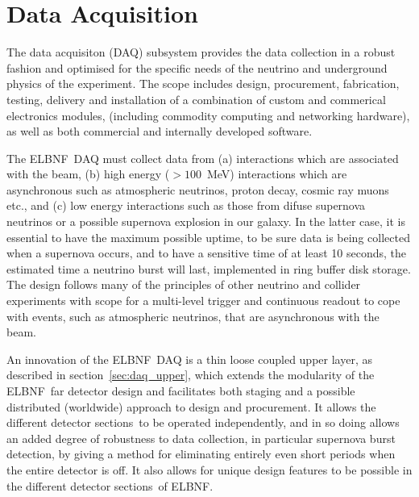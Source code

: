 

\newcommand{\LBNE}{ELBNF}
\newcommand{\COMPARTMENT}{detector section}
\newcommand{\COMPARTMENTS}{detector sections}

\chapter{Data Acquisition}
\label{ch:trig}

The data acquisiton (DAQ) subsystem provides the data collection
in a robust fashion and optimised for the specific needs of the neutrino and
underground physics of the experiment.  The scope includes design,
procurement, fabrication, testing, delivery and installation of a
combination of custom and commerical electronics modules, (including
commodity computing and networking hardware), as well as both
commercial and internally developed software.

The \LBNE\ DAQ must collect data from (a) interactions which are associated
with the beam, (b) high energy ($>100$~MeV) interactions which are asynchronous such as
atmospheric neutrinos, proton decay, cosmic ray muons etc., and (c) low
energy interactions such as those from difuse supernova neutrinos or a
possible supernova explosion in our galaxy.  In the latter case, it is
essential to have the maximum possible uptime, to be sure data is
being collected when a supernova occurs, and to have a sensitive time
of at least 10 seconds, the estimated time a neutrino burst will last,
implemented in ring buffer disk storage.  The design follows many of
the principles of other neutrino and collider experiments with scope
for a multi-level trigger and continuous readout to cope with events,
such as atmospheric neutrinos, that are asynchronous with the beam.

An innovation of the \LBNE\ DAQ is a thin loose coupled upper layer,
as described in section~\ref{sec:daq_upper}, which extends the
modularity of the \LBNE\ far detector design and facilitates both
staging and a possible distributed (worldwide) approach to design and
procurement.   It allows the different \COMPARTMENTS\ to be
operated independently, and in so doing allows an added degree of
robustness to data collection, in particular supernova burst
detection, by giving a method for eliminating entirely even short
periods when the entire detector is off.  It also allows for unique 
design features to be possible in the different \COMPARTMENTS\ 
of \LBNE.

